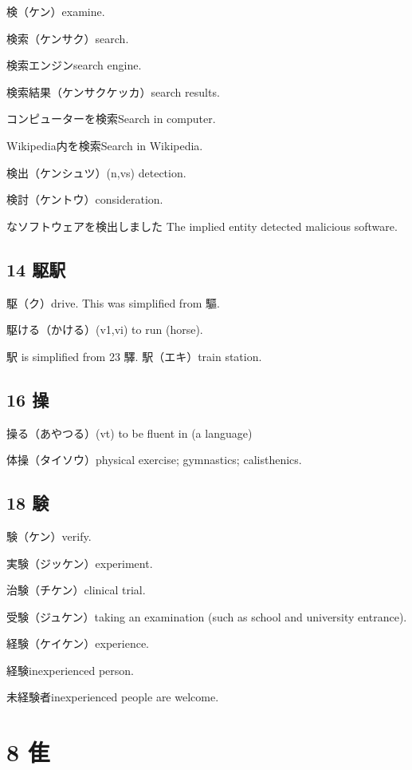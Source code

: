 検（ケン）examine.

検索（ケンサク）search.

検索エンジンsearch engine.

検索結果（ケンサクケッカ）search results.

コンピューターを検索Search in computer.

Wikipedia内を検索Search in Wikipedia.

検出（ケンシュツ）(n,vs) detection.

検討（ケントウ）consideration.

なソフトウェアを検出しました
The implied entity detected malicious software.

\subsection{14 駆駅}

駆（ク）drive.
This was simplified from 驅.

駆ける（かける）(v1,vi) to run (horse).

駅 is simplified from 23 驛.
駅（エキ）train station.

\subsection{16 操}

操る（あやつる）(vt) to be fluent in (a language)

体操（タイソウ）physical exercise; gymnastics; calisthenics.

\subsection{18 験}

験（ケン）verify.

実験（ジッケン）experiment.

治験（チケン）clinical trial.

受験（ジュケン）taking an examination (such as school and university entrance).

経験（ケイケン）experience.

経験inexperienced person.

未経験者inexperienced people are welcome.

\section{8 隹}

